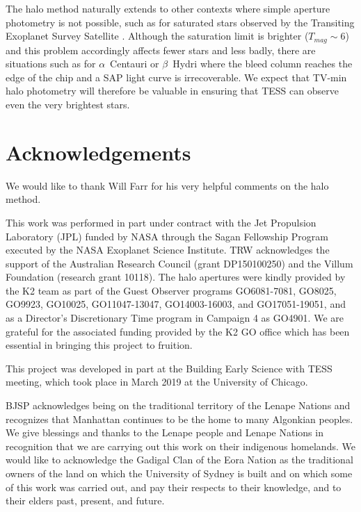 \documentclass[modern]{aastex62}
\begin{document}
The halo method naturally extends to other contexts where simple aperture photometry is not possible, such as for saturated stars observed by the Transiting Exoplanet Survey Satellite \citep[TESS;][]{tess}. Although the saturation limit is brighter ($T_{mag} \sim 6$) and this problem accordingly affects fewer stars and less badly, there are situations such as for $\alpha$~Centauri or $\beta$~Hydri where the bleed column reaches the edge of the chip and a SAP light curve is irrecoverable. We expect that TV-min halo photometry will therefore be valuable in ensuring that TESS can observe even the very brightest stars.

\section*{Acknowledgements} %

We would like to thank Will Farr for his very helpful comments on the halo method.

This work was performed in part under contract with the Jet Propulsion Laboratory (JPL) funded by NASA through the Sagan Fellowship Program executed by the NASA Exoplanet Science Institute. TRW acknowledges the support of the Australian Research Council (grant DP150100250) and the Villum Foundation (research grant 10118). The halo apertures were kindly provided by the K2 team as part of the Guest Observer programs GO6081-7081, GO8025, GO9923, GO10025, GO11047-13047, GO14003-16003, and GO17051-19051, and as a Director's Discretionary Time program in Campaign 4 as GO4901. We are grateful for the associated funding provided by the K2 GO office which has been essential in bringing this project to fruition.

This project was developed in part at the Building Early Science with TESS meeting, which took place in March 2019 at the University of Chicago.

BJSP acknowledges being on the traditional territory of the Lenape Nations and recognizes that Manhattan continues to be the home to many Algonkian peoples. We give blessings and thanks to the Lenape people and Lenape Nations in recognition that we are carrying out this work on their indigenous homelands. We would like to acknowledge the Gadigal Clan of the Eora Nation as the traditional owners of the land on which the University of Sydney is built and on which some of this work was carried out, and pay their respects to their knowledge, and to their elders past, present, and future.
%
\end{document}
